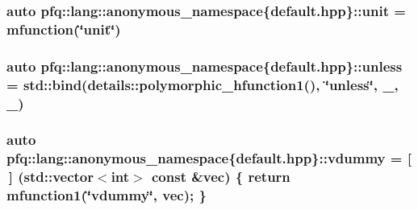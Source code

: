 \hypertarget{namespacepfq_1_1lang_1_1anonymous__namespace_02default_8hpp_03_a85f9b2d401cbb1d135679160de0e97de}{
\subsubsection[{unit}]{\setlength{\rightskip}{0pt plus 5cm}auto pfq\+::lang\+::anonymous\+\_\+namespace\{default.\+hpp\}\+::unit = {\bf mfunction}(\char`\"{}unit\char`\"{})}}\label{namespacepfq_1_1lang_1_1anonymous__namespace_02default_8hpp_03_a85f9b2d401cbb1d135679160de0e97de}
\hypertarget{namespacepfq_1_1lang_1_1anonymous__namespace_02default_8hpp_03_a4873d64e4d84c7c4c4cabe782de2b7b0}{
\subsubsection[{unless}]{\setlength{\rightskip}{0pt plus 5cm}auto pfq\+::lang\+::anonymous\+\_\+namespace\{default.\+hpp\}\+::unless = std\+::bind(details\+::polymorphic\+\_\+hfunction1(), \char`\"{}unless\char`\"{}, \+\_, \+\_)}}\label{namespacepfq_1_1lang_1_1anonymous__namespace_02default_8hpp_03_a4873d64e4d84c7c4c4cabe782de2b7b0}
\hypertarget{namespacepfq_1_1lang_1_1anonymous__namespace_02default_8hpp_03_a5903cd45f9167fd8c2b0080c0afed6e5}{
\subsubsection[{vdummy}]{\setlength{\rightskip}{0pt plus 5cm}auto pfq\+::lang\+::anonymous\+\_\+namespace\{default.\+hpp\}\+::vdummy = \mbox{[}$\,$\mbox{]} (std\+::vector$<$int$>$ const \&vec) \{ return {\bf mfunction1}(\char`\"{}vdummy\char`\"{}, vec); \}}}\label{namespacepfq_1_1lang_1_1anonymous__namespace_02default_8hpp_03_a5903cd45f9167fd8c2b0080c0afed6e5}
